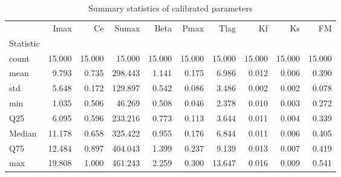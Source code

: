 \begin{table}
\caption{Summary statistics of calibrated parameters}
\label{tab:param_summary}
\begin{tabular}{lrrrrrrrrr}
\toprule
 & Imax & Ce & Sumax & Beta & Pmax & Tlag & Kf & Ks & FM \\
Statistic &  &  &  &  &  &  &  &  &  \\
\midrule
count & 15.000 & 15.000 & 15.000 & 15.000 & 15.000 & 15.000 & 15.000 & 15.000 & 15.000 \\
mean & 9.793 & 0.735 & 298.443 & 1.141 & 0.175 & 6.986 & 0.012 & 0.006 & 0.390 \\
std & 5.648 & 0.172 & 129.897 & 0.542 & 0.086 & 3.486 & 0.002 & 0.002 & 0.078 \\
min & 1.035 & 0.506 & 46.269 & 0.508 & 0.046 & 2.378 & 0.010 & 0.003 & 0.272 \\
Q25 & 6.095 & 0.596 & 233.216 & 0.773 & 0.113 & 3.644 & 0.011 & 0.004 & 0.339 \\
Median & 11.178 & 0.658 & 325.422 & 0.955 & 0.176 & 6.844 & 0.011 & 0.006 & 0.405 \\
Q75 & 12.484 & 0.897 & 404.043 & 1.399 & 0.237 & 9.139 & 0.013 & 0.007 & 0.419 \\
max & 19.808 & 1.000 & 461.243 & 2.259 & 0.300 & 13.647 & 0.016 & 0.009 & 0.541 \\
\bottomrule
\end{tabular}
\end{table}
